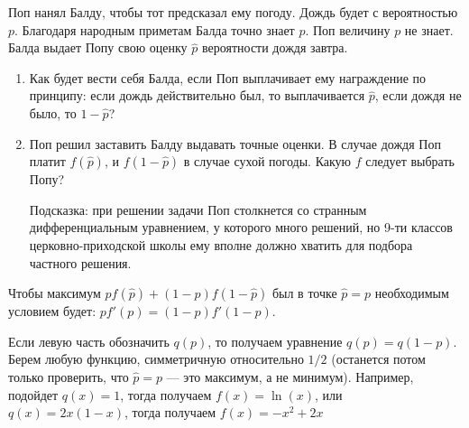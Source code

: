 \begin{problem}
Поп нанял Балду, чтобы тот предсказал ему погоду. Дождь будет с
вероятностью $p$. Благодаря народным приметам Балда точно знает
$p$. Поп величину $p$ не знает. Балда выдает Попу
свою оценку $\hat{p}$ вероятности дождя завтра. \par
\begin{enumerate}
\item  Как будет вести себя Балда, если Поп выплачивает ему
награждение по принципу: если дождь действительно был, то
выплачивается $\hat{p}$, если дождя не было, то
$1-\hat{p}$? \par
\item Поп решил заставить Балду выдавать точные оценки. В случае
дождя Поп платит $f(\hat{p})$, и $f(1-\hat{p})$ в случае
сухой погоды. Какую $f$ следует выбрать Попу? \par
Подсказка: при решении задачи Поп столкнется со странным
дифференциальным уравнением, у которого много решений, но 9-ти
классов церковно-приходской школы ему вполне должно хватить для
подбора частного решения.
\end{enumerate}


\begin{sol}

Чтобы максимум $p f(\hat{p})+(1-p)f(1-\hat{p})$ был в точке
$\hat{p}=p$ необходимым условием будет:
$pf'(p)=(1-p)f'(1-p)$. \par
Если левую часть обозначить $q(p)$, то получаем уравнение
$q(p)=q(1-p)$. Берем любую функцию, симметричную относительно
$1/2$ (останется потом только проверить, что $\hat{p}=p$ — это
максимум, а не минимум). Например, подойдет $q(x)=1$, тогда
получаем $f(x)=\ln(x)$, или $q(x)=2x(1-x)$, тогда получаем
$f(x)=-x^{2}+2x$
\end{sol}
\end{problem}



